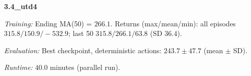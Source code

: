 \noindent\textbf{3.4_utd4}\par
\emph{Training:} Ending MA(50) = $266.1$. Returns (max/mean/min): all episodes $315.8/150.9/-532.9$; last 50 $315.8/266.1/63.8$ (SD $36.4$).\par
\emph{Evaluation:} Best checkpoint, deterministic actions: $243.7\pm 47.7$ (mean $\pm$ SD).\par
\emph{Runtime:} $40.0$ minutes (parallel run).\par
